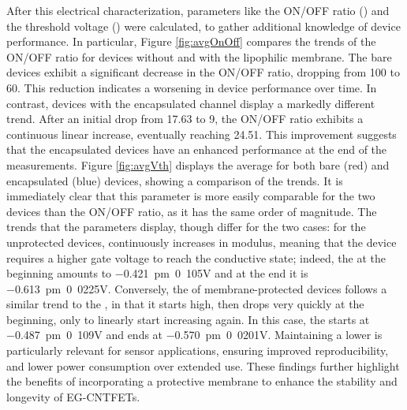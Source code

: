 After this electrical characterization, parameters like the ON/OFF ratio (\ratio{}) and the threshold voltage (\vth{}) were calculated, to gather additional knowledge of device performance. In particular, Figure \ref{fig:avgOnOff} compares the trends of the ON/OFF ratio for devices without and with the lipophilic membrane. The bare devices exhibit a significant decrease in the ON/OFF ratio, dropping from 100 to 60. This reduction indicates a worsening in device performance over time. In contrast, devices with the encapsulated channel display a markedly different trend. After an initial drop from 17.63 to 9, the ON/OFF ratio exhibits a continuous linear increase, eventually reaching 24.51. This improvement suggests that the encapsulated devices have an enhanced performance at the end of the measurements.
Figure \ref{fig:avgVth} displays the average \vth{} for both bare (red) and encapsulated (blue) devices, showing a comparison of the trends. It is immediately clear that this parameter is more easily comparable for the two devices than the ON/OFF ratio, as it has the same order of magnitude. The trends that the parameters display, though differ for the two cases: for the unprotected devices, \vth{} continuously increases in modulus, meaning that the device requires a higher gate voltage to reach the conductive state; indeed, the \vth{} at the beginning amounts to \SI{-0.421}{\pm 0.105}{V} and at the end it is \SI{-0.613}{\pm 0.0225}{V}. Conversely, the \vth{} of membrane-protected devices
follows a similar trend to the \ion{}, in that it starts high, then drops very quickly at the beginning, only to linearly start increasing again. In this case, the \vth{} starts at \SI{-0.487}{\pm 0.109}{V} and ends at \SI{-0.570}{\pm 0.0201}{V}. Maintaining a lower \vth{} is particularly relevant for sensor applications, ensuring improved reproducibility, and lower power consumption over extended use. These findings further highlight the benefits of incorporating a protective membrane to enhance the stability and longevity of EG-CNTFETs.

